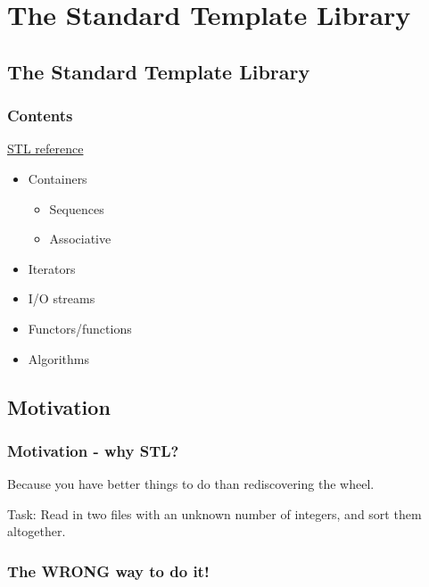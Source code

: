 \section{The Standard Template
Library}\label{the-standard-template-library}

\subsection{The Standard Template
Library}\label{the-standard-template-library-1}

\subsubsection{Contents}\label{contents}

\href{http://www.cplusplus.com/reference/}{STL reference}

\begin{itemize}
\itemsep1pt\parskip0pt
\item
  Containers

  \begin{itemize}
  \itemsep1pt\parskip0pt
  \item
    Sequences
  \item
    Associative
  \end{itemize}
\item
  Iterators
\item
  I/O streams
\item
  Functors/functions
\item
  Algorithms
\end{itemize}

\subsection{Motivation}\label{motivation}

\subsubsection{Motivation - why STL?}\label{motivation---why-stl}

Because you have better things to do than rediscovering the wheel.

Task: Read in two files with an unknown number of integers, and sort
them altogether.

\subsubsection{The \textbf{WRONG} way to do
it!}\label{the-wrong-way-to-do-it}

